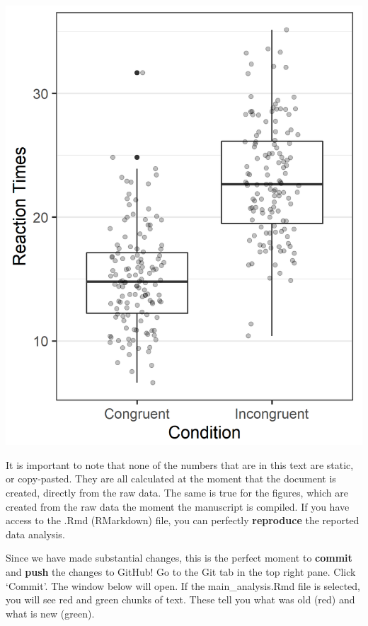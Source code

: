 \documentclass[
  oneside]{krantz}
\begin{document}
\begin{center}\includegraphics[width=1\linewidth]{images/dc72012da17d44752af4ab572c6c20d2} \end{center}

It is important to note that none of the numbers that are in this text are
static, or copy-pasted. They are all calculated at the moment that the document
is created, directly from the raw data. The same is true for the figures, which
are created from the raw data the moment the manuscript is compiled. If you have
access to the .Rmd (RMarkdown) file, you can perfectly \textbf{reproduce} the
reported data analysis.

Since we have made substantial changes, this is the perfect moment to \textbf{commit}
and \textbf{push} the changes to GitHub! Go to the Git tab in the top right pane.
Click `Commit'. The window below will open. If the main\_analysis.Rmd file is
selected, you will see red and green chunks of text. These tell you what was old
(red) and what is new (green).
\end{document}
